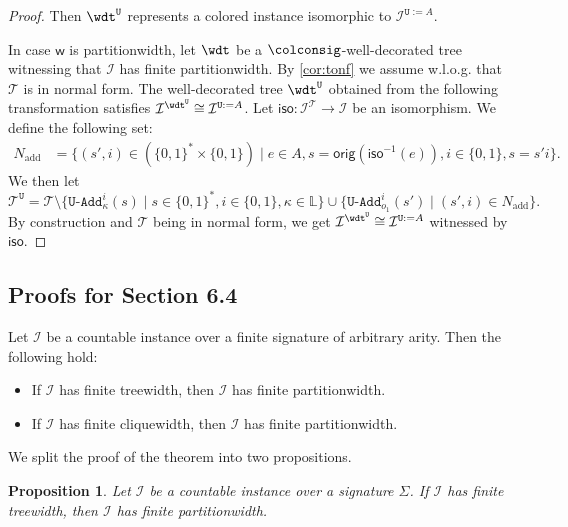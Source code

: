 \documentclass[10pt,a4paper]{amsart}
\theoremstyle{definition}
\numberwithin{equation}{section}
\theoremstyle{plain}
\newtheorem{proposition}[proposition]{Proposition}
\theoremstyle{definition}
\theoremstyle{myexample}
\theoremstyle{plain}
\newenvironment{customthm}[1]
  {\renewcommand\theinnercustomthm{#1}\innercustomthm}
  {\endinnercustomthm}
\theoremstyle{definition}
\newcommand{\instance}{\mathcal{I}}
\newcommand{\inst}{\instance}
\newcommand{\origcol}{o}
\newcommand{\cols}{\mathbb{L}}
\newcommand{\unradd}[2]{#2\pred{\texttt{-}Add}_{#1}}
\newcommand{\ercwidth}{\partitionwidth}
\newcommand{\hypercliquewidth}{\partitionwidth}
\newcommand{\partitionwidth}{par\-ti\-tion\-width}
\newcommand{\fcn}[1]{\mathsf{#1}}
\newcommand{\pred}[1]{\mathtt{#1}}
\begin{document}
\begin{proof}
Then $\wdt^{\pred{U}}$ represents a colored instance isomorphic to $\inst^{\pred{U}:=A}$.

\bigskip
In case $\fcn{w}$ is \hypercliquewidth{}, let $\wdt$ be a $\colconsig$-well-decorated tree witnessing that $\inst$ has finite \hypercliquewidth{}. By \cref{cor:tonf} we assume w.l.o.g. that $\mathcal{T}$ is in normal form. The well-decorated tree $\wdt^{\pred{U}}$ obtained from the following transformation satisfies $\inst^{\wdt^{\pred{U}}} \cong \inst^{\pred{U}:=A}$. Let $\fcn{iso}\colon \inst^{\mathcal{T}}\to \inst$ be an isomorphism. We define the following set:
\begin{align*}
	N_{\mathrm{add}} &=  \{ (s', i )\in (\{ 0,1 \}^*\times \{ 0,1 \}) \mid e\in A, s = \fcn{orig}(\fcn{iso}^{-1}(e)), i\in\{ 0,1 \}, s = s'i  \}.
\end{align*}
We then let
$$
\mathcal{T}^{\pred{U}} = \mathcal{T}  
\setminus \{\unradd{\kappa}{\pred{U}}^{i}(s) \mid s \in \{ 0,1 \}^*, i\in\{ 0,1 \}, \kappa \in \cols\}
\cup \{ \unradd{\origcol_{1}}{\pred{U}}^{i}(s') \mid (s',i)\in N_{\mathrm{add}} \} .
$$%
By construction and $\mathcal{T}$ being in normal form, we get $\inst^{\wdt^{\pred{U}}} \cong \inst^{\pred{U}:=A}$ witnessed by $\fcn{iso}$.
\end{proof}


\subsection{Proofs for Section 6.4}

\begin{customthm}{\ref{thm:tree-width-implies-clique-width}}
	Let $\inst$ be a countable instance over a finite signature of arbitrary arity. Then the following hold:
	\begin{itemize}
		\item If $\inst$ has finite treewidth, then $\inst$ has finite \ercwidth{}.
		\item If $\inst$ has finite cliquewidth, then $\inst$ has finite \ercwidth{}.
	\end{itemize}
\end{customthm}

We split the proof of the theorem into two propositions.

\begin{proposition}\label{prop:tw-implies-pw}
	Let $\inst$ be a countable instance over a signature $\Sigma$. If $\inst$ has finite treewidth, then $\inst$ has finite \ercwidth{}.
\end{proposition}
\end{document}
